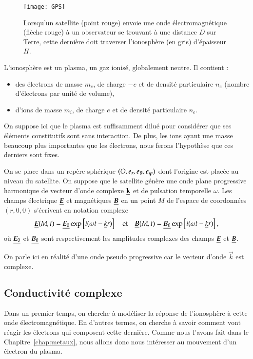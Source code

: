 \begin{figure}[t]
	\centering
	\texttt{[image: GPS]}
	\caption{Lorsqu'un satellite (point rouge) envoie une onde 
		électromagnétique (flèche rouge)
		à un observateur se trouvant à une distance $D$ sur Terre,
		cette dernière doit traverser l'ionosphère (en gris) d'épaisseur
		$H$.}%
	\label{fig:maxwell_GPS}
\end{figure}

L'ionosphère est un plasma, un gaz ionisé, globalement neutre. Il contient :
\begin{itemize}
	\item des électrons de masse $m_e$, de charge $-e$ et de densité particulaire
	  $n_e$ (nombre d'électrons par unité de volume),
	\item d'ions de masse $m_i$, de charge $e$ et de densité particulaire $n_e$.
\end{itemize}
On suppose ici que le plasma est suffisamment dilué pour considérer que ses éléments 
constitutifs sont sans interaction. De plus, les ions ayant une masse beaucoup plus
importantes que les électrons, nous ferons l'hypothèse que ces derniers sont fixes.

On se place dans un repère sphérique $(O, \er, \etheta, \ephi)$ dont l'origine est 
placée au niveau du satellite. On suppose que le satellite génère une onde plane
progressive harmonique de vecteur d'onde complexe $\underline{\mathbf{k}}$ et de pulsation
temporelle $\omega$. Les champs électrique $\complex{\vece}$ et magnétiques 
$\complex{\vecb}$ en un point $M$ de l'espace de coordonnées $(r, 0, 0)$ 
s'écrivent en notation complexe
\begin{equation*}
	\complex{\vece}(M, t) = \complex{\vece_0} 
	\exp\left[i(\omega t - \complex{k} r
	)\right]
	\quad \mathrm{et} \quad
	\complex{\vecb}(M, t) = \complex{\vecb_0} 
	\exp\left[i(\omega t - \complex{k} r
	)\right],
\end{equation*}
où $\complex{\vece_0}$ et $\complex{\vecb_0}$ sont respectivement 
les amplitudes complexes des champs $\complex{\vece}$ et $\complex{\vecb}$.

\begin{rema}
	On parle ici en réalité d'une onde pseudo progressive 
	car le vecteur d'onde $\vec{k}$ est complexe.
\end{rema}

\subsection{Conductivité complexe}
Dans un premier temps, on cherche à modéliser la réponse de l'ionosphère à cette onde 
électromagnétique. En d'autres termes, on cherche à savoir comment vont réagir les
électrons qui composent cette dernière. Comme nous l'avons fait dans le 
Chapitre~\ref{chap:metaux}, nous allons donc nous intéresser au mouvement d'un électron
du plasma.

